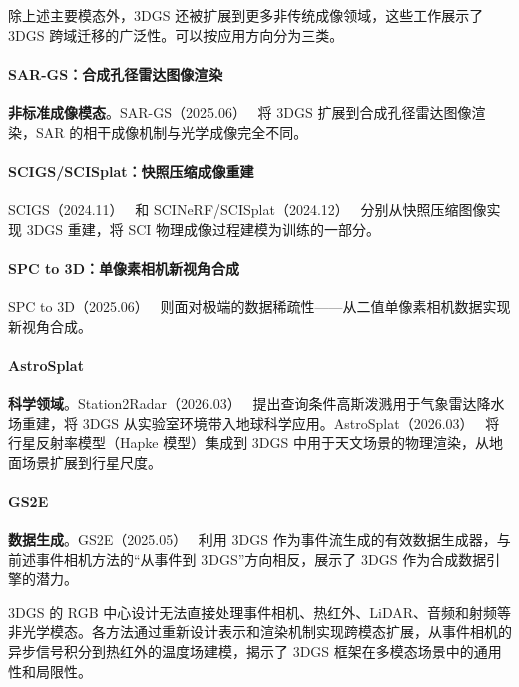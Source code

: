 除上述主要模态外，3DGS 还被扩展到更多非传统成像领域，这些工作展示了 3DGS 跨域迁移的广泛性。可以按应用方向分为三类。

\paragraph{SAR-GS：合成孔径雷达图像渲染}
\textbf{非标准成像模态}。SAR-GS（2025.06）~\cite{2506_21633} 将 3DGS 扩展到合成孔径雷达图像渲染，SAR 的相干成像机制与光学成像完全不同。

\paragraph{SCIGS/SCISplat：快照压缩成像重建}
SCIGS（2024.11）~\cite{2411_12471} 和 SCINeRF/SCISplat（2024.12）~\cite{2412_19483} 分别从快照压缩图像实现 3DGS 重建，将 SCI 物理成像过程建模为训练的一部分。

\paragraph{SPC to 3D：单像素相机新视角合成}
SPC to 3D（2025.06）~\cite{2506_06890} 则面对极端的数据稀疏性——从二值单像素相机数据实现新视角合成。

\paragraph{AstroSplat}
\textbf{科学领域}。Station2Radar（2026.03）~\cite{2603_00418} 提出查询条件高斯泼溅用于气象雷达降水场重建，将 3DGS 从实验室环境带入地球科学应用。AstroSplat（2026.03）~\cite{2603_11969} 将行星反射率模型（Hapke 模型）集成到 3DGS 中用于天文场景的物理渲染，从地面场景扩展到行星尺度。

\paragraph{GS2E}
\textbf{数据生成}。GS2E（2025.05）~\cite{2505_15287} 利用 3DGS 作为事件流生成的有效数据生成器，与前述事件相机方法的“从事件到 3DGS”方向相反，展示了 3DGS 作为合成数据引擎的潜力。

\begin{takeaway}
3DGS 的 RGB 中心设计无法直接处理事件相机、热红外、LiDAR、音频和射频等非光学模态。各方法通过重新设计表示和渲染机制实现跨模态扩展，从事件相机的异步信号积分到热红外的温度场建模，揭示了 3DGS 框架在多模态场景中的通用性和局限性。
\end{takeaway}

